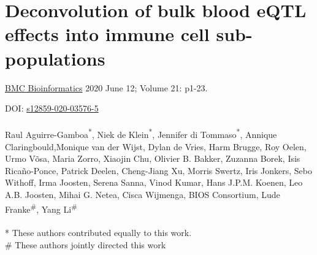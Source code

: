 \chapterfont{\huge\color{DarkBlue}}  %
\sectionfont{\color{DarkBlue}}  %
\subsectionfont{\color{DarkBlue}}  %

\renewcommand\pcolor{DarkBlue}
\renewcommand{\headrule}{\hbox to\headwidth{%
		\color{DarkBlue}\leaders\hrule height \headrulewidth\hfill}} %
\fancyfoot[LE,RO]{\thepage}



\cleardoublepage
\makeatletter
\let\savedchap\@makechapterhead
\def\@makechapterhead{\vspace*{-3cm}\savedchap}
\chapter[Deconvolution of bulk blood eQTL effects into immune cell sub-populations]{Deconvolution of bulk blood eQTL effects into immune cell sub-populations}

\label{chap:chapter4-deconvolution}
\chaptermark{}
\let\@makechapterhead\savedchap
\makeatletter


\hfill \underline{BMC Bioinformatics} 2020 June 12; Volume 21: p1-23.

\hfill DOI: \href{https://doi.org/10.1186/s12859-020-03576-5}{s12859-020-03576-5}
\\
\\
Raul Aguirre-Gamboa\textsuperscript{*}, Niek de Klein\textsuperscript{*}, Jennifer di Tommaso\textsuperscript{*}, Annique Claringbould,Monique van der Wijst, Dylan de Vries, Harm Brugge, Roy Oelen, Urmo Võsa, Maria Zorro, Xiaojin Chu, Olivier B. Bakker, Zuzanna Borek, Isis Ricaño-Ponce, Patrick Deelen, Cheng-Jiang Xu, Morris Swertz, Iris Jonkers, Sebo Withoff, Irma Joosten, Serena Sanna, Vinod Kumar, Hans J.P.M. Koenen, Leo A.B. Joosten, Mihai G. Netea, Cisca Wijmenga, BIOS Consortium, Lude Franke\textsuperscript{\#}, Yang Li\textsuperscript{\#}
\\
\\
* These authors contributed equally to this work. \\
\# These authors jointly directed this work

\newpage

